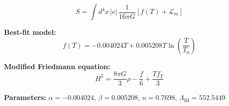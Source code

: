 
\begin{equation}
  S = \int d^4x \, |e| \, \frac{1}{16\pi G} \left[ f(T) + \mathcal{L}_m \right]
\end{equation}

\textbf{Best-fit model:}
\begin{equation}
  f(T) = -0.004024 T + 0.005208 T \ln\!\left(\frac{T}{T_0}\right)
\end{equation}

\textbf{Modified Friedmann equation:}
\begin{equation}
  H^2 = \frac{8\pi G}{3} \rho - \frac{f}{6} + \frac{T f_T}{3}
\end{equation}

\textbf{Parameters:}
$\alpha = -0.004024$, \quad
$\beta = 0.005208$, \quad
$n = 0.7698$, \quad
$\Lambda_{\text{BI}} = 552.5449$